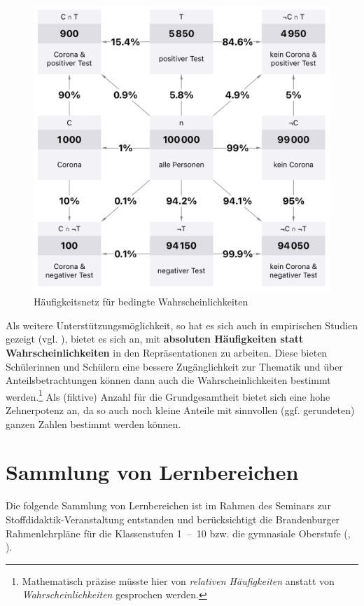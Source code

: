 \documentclass[
]{scrbook}
\theoremstyle{definition}
\theoremstyle{definition}
\theoremstyle{definition}
\theoremstyle{definition}
\theoremstyle{remark}
\begin{document}
\begin{figure}

{\centering \includegraphics[width=0.75\linewidth]{pictures/12-Netz} 

}

\caption{Häufigkeitsnetz für bedingte Wahrscheinlichkeiten}\label{fig:Netz}
\end{figure}

Als weitere Unterstützungsmöglichkeit, so hat es sich auch in empirischen Studien gezeigt (vgl. ), bietet es sich an, mit \textbf{absoluten Häufigkeiten statt Wahrscheinlichkeiten} in den Repräsentationen zu arbeiten. Diese bieten Schülerinnen und Schülern eine bessere Zugänglichkeit zur Thematik und über Anteilsbetrachtungen können dann auch die Wahrscheinlichkeiten bestimmt werden.\footnote{Mathematisch präzise müsste hier von \emph{relativen Häufigkeiten} anstatt von \emph{Wahrscheinlichkeiten} gesprochen werden.} Als (fiktive) Anzahl für die Grundgesamtheit bietet sich eine hohe Zehnerpotenz an, da so auch noch kleine Anteile mit sinnvollen (ggf. gerundeten) ganzen Zahlen bestimmt werden können.

\appendix


\chapter{Sammlung von Lernbereichen}\label{sammlung-von-lernbereichen}

Die folgende Sammlung von Lernbereichen ist im Rahmen des Seminars zur Stoffdidaktik-Veranstaltung entstanden und berücksichtigt die Brandenburger Rahmenlehrpläne für die Klassenstufen 1~--~10 bzw. die gymnasiale Oberstufe (, ).
\end{document}
